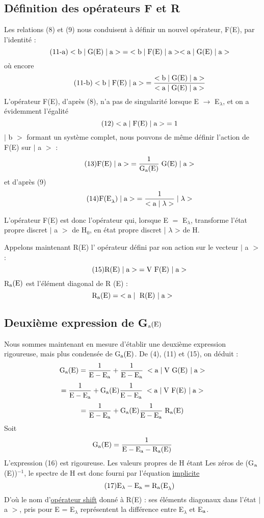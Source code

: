 \subsection{Définition des opérateurs F et R}%
Les relations (8) et (9) nous conduisent à définir un nouvel opérateur, F(E), par l'identité :
\[
\tag{11-a}<\text{b}\;|\;\text{G(E)}\;|\;\text{a}>\;=\;<\text{b}\;|\;\text{F(E)}\;|\;\text{a}><\text{a}\;|\;\text{G(E)}\;|\;\text{a}>
\]
où encore
\[
\tag{11-b}<\text{b}\;|\;\text{F(E)}\;|\;\text{a}>\;=\frac{<\text{b}\;|\;\text{G(E)}\;|\;\text{a}>}
{<\text{a}\;|\;\text{G(E)}\;|\;\text{a}>}
\]
L'opérateur F(E), d'après (8), n'a pas de singularité lorsque E $\to$ E$_\lambda$, et on a évidemment l'égalité
\[
\tag{12}<\text{a}\;|\;\text{F(E)}\;|\;\text{a}>\;=1
\]
$|$ b $>$ formant un système complet, nous pouvons de même définir l'action de F(E) sur $|$ a $>$ :
\[
\tag{13}\text{F(E)}\;|\;\text{a}>\;=\frac{1}{\text{G}_{\text{a}}\text{(E)}}\;\text{G(E)}\;|\;\text{a}>
\]
et d'après (9)
\[
\tag{14}\text{F(E}_\lambda)\;|\;\text{a}>\;=\frac{1}{<\text{a}\;|\;\lambda>}\;|\;\lambda>
\]

L'opérateur F(E) est donc l'opérateur qui, lorsque E $=$ E$_\lambda$, transforme l'état
propre discret $|$ a $>$ de H$_0$, en état propre discret | $\lambda$ > de H.

Appelons maintenant R(E) l' opérateur défini par son action sur le
vecteur $|$ a $>$ :
\[
\tag{15}\text{R(E)}\;|\;\text{a}>\;=\text{V F(E) }|\;\text{a}>
\]
R$_{\text{a}}\text{(E)}$ est l'élément diagonal de R (E) :
\[
\text{R}_{\text{a}}\text{(E)}=\;<\text{a}\;|\;\text{ R(E) }|\;\text{a}>
\]
\subsection{Deuxième expression de G$_{\text{a}}\text{(E)}$}%
Nous sommes maintenant en mesure d'établir une deuxième expression
rigoureuse, mais plus condensée de G$_{\text{a}}\text{(E)}$.
De (4), (11) et (15), on déduit :
\[
\text{G}_{\text{a}}\text{(E)}=\frac{1}{\text{E}-\text{E}_{\text{a}}}+\frac{1}{\text{E}-\text{E}_{\text{a}}}\;<\text{a}\;|\;\text{V G(E) }|\;\text{a}>
\]
\[
=\frac{1}{\text{E}-\text{E}_{\text{a}}}+\text{G}_{\text{a}}\text{(E)}\frac{1}{\text{E}-\text{E}_{\text{a}}}\;<\text{a}\;|\;\text{V F(E) }|\;\text{a}>
\]
\[
=\frac{1}{\text{E}-\text{E}_{\text{a}}}+\text{G}_{\text{a}}\text{(E)}\frac{1}{\text{E}-\text{E}_{\text{a}}}\;\text{R}_{\text{a}}\text{(E)}
\]
Soit
\[
\text{G}_{\text{a}}\text{(E)}=\frac{1}{\text{E}-\text{E}_{\text{a}}-\text{R}_{\text{a}}\text{(E)}}
\]
L'expression (16) est rigoureuse. Les valeurs propres de H étant Les zéros de
(G$_{\text{a}}$(E))$^{-1}$, le spectre de H est donc fourni par l'équation \ul{implicite}
\[
\tag{17}\text{E}_\lambda-\text{E}_{\text{a}}=\text{R}_{\text{a}}\text{(E}_\lambda)
\]
D'où le nom d'\ul{opérateur shift} donné à R(E) : ses éléments diagonaux dans l'état
$|$ a $>$, pris pour E = E$_\lambda$ représentent la différence entre E$_\lambda$ et E$_{\text{a}}$.

